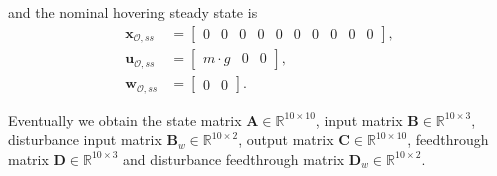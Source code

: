 and the nominal hovering steady state is
\begin{align}
\mathbf{x}_{\mathcal{O},ss} &= \begin{bmatrix}
0 & 0 & 0 & 0 & 0 & 0 & 0 & 0 & 0 & 0
\end{bmatrix} ,\\
\mathbf{u}_{\mathcal{O},ss} &= \begin{bmatrix}
m \cdot g & 0 & 0
\end{bmatrix} ,\\ 
\mathbf{w}_{\mathcal{O},ss} &= \begin{bmatrix}
0 & 0 
\end{bmatrix}.
\end{align}

Eventually we obtain the state matrix $\mathbf{A} \in \mathbb{R}^{10\times10}$, input matrix $\mathbf{B} \in \mathbb{R}^{10\times3}$, disturbance input matrix $\mathbf{B}_w \in \mathbb{R}^{10\times2}$, output matrix $\mathbf{C} \in \mathbb{R}^{10\times10}$,  feedthrough matrix $\mathbf{D} \in \mathbb{R}^{10\times3}$ and disturbance feedthrough matrix  $\mathbf{D}_w \in \mathbb{R}^{10\times2}$. 

